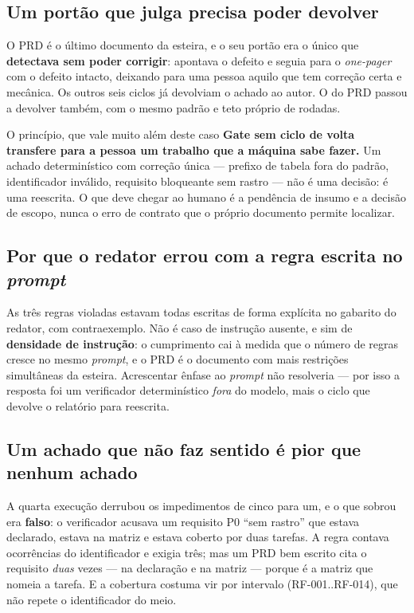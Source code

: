 \documentclass[11pt,a4paper]{article}
\newcommand{\cod}[1]{{\ttfamily\small #1}}
\begin{document}
\subsection{Um portão que julga precisa poder devolver}

O PRD é o último documento da esteira, e o seu portão era o único que \textbf{detectava sem poder corrigir}: apontava o defeito e seguia para o \emph{one-pager} com o defeito intacto, deixando para uma pessoa aquilo que tem correção certa e mecânica. Os outros seis ciclos já devolviam o achado ao autor. O do PRD passou a devolver também, com o mesmo padrão e teto próprio de rodadas.

\begin{caixaConceito}{O princípio, que vale muito além deste caso}
\textbf{Gate sem ciclo de volta transfere para a pessoa um trabalho que a máquina sabe fazer.} Um achado determinístico com correção única --- prefixo de tabela fora do padrão, identificador inválido, requisito bloqueante sem rastro --- não é uma decisão: é uma reescrita. O que deve chegar ao humano é a pendência de insumo e a decisão de escopo, nunca o erro de contrato que o próprio documento permite localizar.
\end{caixaConceito}

\subsection{Por que o redator errou com a regra escrita no \emph{prompt}}

As três regras violadas estavam todas escritas de forma explícita no gabarito do redator, com contraexemplo. Não é caso de instrução ausente, e sim de \textbf{densidade de instrução}: o cumprimento cai à medida que o número de regras cresce no mesmo \emph{prompt}, e o PRD é o documento com mais restrições simultâneas da esteira. Acrescentar ênfase ao \emph{prompt} não resolveria --- por isso a resposta foi um verificador determinístico \emph{fora} do modelo, mais o ciclo que devolve o relatório para reescrita.

\subsection{Um achado que não faz sentido é pior que nenhum achado}

A quarta execução derrubou os impedimentos de cinco para um, e o que sobrou era \textbf{falso}: o verificador acusava um requisito P0 ``sem rastro'' que estava declarado, estava na matriz e estava coberto por duas tarefas. A regra contava ocorrências do identificador e exigia três; mas um PRD bem escrito cita o requisito \emph{duas} vezes --- na declaração e na matriz --- porque é a matriz que nomeia a tarefa. E a cobertura costuma vir por intervalo (\cod{RF-001..RF-014}), que não repete o identificador do meio.
\end{document}

